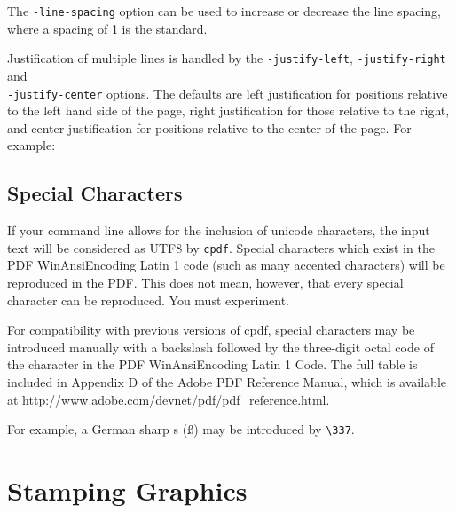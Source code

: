 \documentclass{book}
\begin{document}
The \texttt{-line-spacing} option can be used to increase or decrease the line
spacing, where a spacing of 1 is the standard.

\noindent{}


\noindent Justification of multiple lines is handled by the \texttt{-justify-left}, 
\texttt{-justify-right} and\\ \texttt{-justify-center} options. The defaults are
left justification for positions relative to the left hand side of the page,
right justification for those relative to the right, and center justification
for positions relative to the center of the page. For example:

\noindent{}


\subsection{Special Characters}

If your command line allows for the inclusion of unicode characters, the input
text will be considered as UTF8 by \verb!cpdf!. Special characters which exist
in the PDF WinAnsiEncoding Latin 1 code (such as many accented characters) will
be reproduced in the PDF. This does not mean, however, that every special
character can be reproduced. You must experiment.

For compatibility with previous versions of cpdf, special characters may be
introduced manually with a backslash followed by the three-digit octal code of
the character in the PDF WinAnsiEncoding Latin 1 Code. The full table is
included in Appendix D of the Adobe PDF Reference Manual, which is available at
\url{http://www.adobe.com/devnet/pdf/pdf_reference.html}.

For example, a German sharp s (\ss) may be introduced by \verb!\337!. 



\section{Stamping Graphics}
\end{document}
